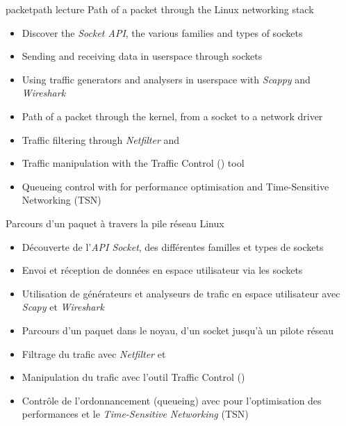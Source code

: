 {packetpath}
{lecture}
{Path of a packet through the Linux networking stack}
{
  \begin{itemize}
  \item Discover the {\em Socket API}, the various families and types
    of sockets
  \item Sending and receiving data in userspace through sockets
  \item Using traffic generators and analysers in userspace with {\em
    Scappy} and {\em Wireshark}
  \item Path of a packet through the kernel, from a socket to a
    network driver
  \item Traffic filtering through {\em Netfilter} and 
  \item Traffic manipulation with the Traffic Control () tool
  \item Queueing control with  for performance optimisation
    and Time-Sensitive Networking (TSN)
  \end{itemize}
}
{Parcours d’un paquet à travers la pile réseau Linux}
{
  \begin{itemize}
  \item Découverte de l’{\em API Socket}, des différentes familles et
    types de sockets
  \item Envoi et réception de données en espace utilisateur via les
    sockets
  \item Utilisation de générateurs et analyseurs de trafic en espace
    utilisateur avec {\em Scapy} et {\em Wireshark}
  \item Parcours d’un paquet dans le noyau, d’un socket jusqu’à un
    pilote réseau
  \item Filtrage du trafic avec {\em Netfilter} et 
  \item Manipulation du trafic avec l’outil Traffic Control
    ()
  \item Contrôle de l’ordonnancement (queueing) avec  pour
    l’optimisation des performances et le {\em Time-Sensitive
      Networking} (TSN)
  \end{itemize}
}


